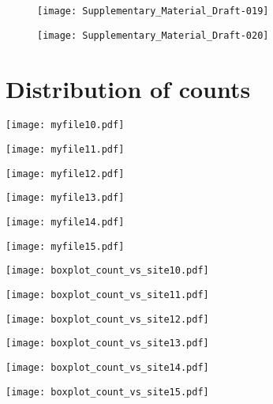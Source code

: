 \documentclass[a4paper]{article}
\begin{document}
\begin{figure}[h!]
\texttt{[image: Supplementary\_Material\_Draft-019]}
\end{figure}	

\begin{figure}[h!]
\texttt{[image: Supplementary\_Material\_Draft-020]}
\end{figure}	





\clearpage



\section{Distribution of counts}


\texttt{[image: myfile10.pdf]}

\texttt{[image: myfile11.pdf]}

\texttt{[image: myfile12.pdf]}

\texttt{[image: myfile13.pdf]}

\texttt{[image: myfile14.pdf]}

\texttt{[image: myfile15.pdf]}


\texttt{[image: boxplot\_count\_vs\_site10.pdf]}

\texttt{[image: boxplot\_count\_vs\_site11.pdf]}

\texttt{[image: boxplot\_count\_vs\_site12.pdf]}

\texttt{[image: boxplot\_count\_vs\_site13.pdf]}

\texttt{[image: boxplot\_count\_vs\_site14.pdf]}

\texttt{[image: boxplot\_count\_vs\_site15.pdf]}
\end{document}
